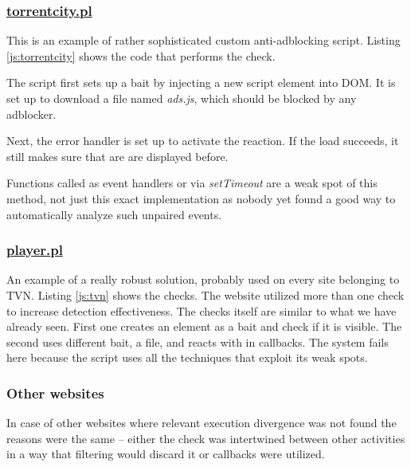 \subsubsection{\url{torrentcity.pl}}
This is an example of rather sophisticated custom anti-adblocking script.
Listing \ref{js:torrentcity} shows the code that performs the check.


                       
The script first sets up a bait by injecting a new script element into DOM. It is set up to download
a file named \emph{ads.js}, which should be blocked by any adblocker.

Next, the error handler is set up to activate the reaction. If the load succeeds, it still
makes sure that are are displayed before.

Functions called as event handlers or via \emph{setTimeout} are a weak spot of this method,
not just this exact implementation as nobody yet found a good way to automatically
analyze such unpaired events.

\subsubsection{\url{player.pl}}
An example of a really robust solution, probably used on every site belonging to TVN.
Listing \ref{js:tvn} shows the checks. The website utilized more than one check
to increase detection effectiveness.
The checks itself are similar to what we have already seen. First one creates an element as a bait 
and check if it is visible. The second uses different bait, a file, and reacts with in callbacks.
The system fails here because the script uses all the techniques that exploit its weak spots.



\subsubsection{Other websites}
In case of other websites where relevant execution divergence was not found 
the reasons were the same -- either the check was intertwined between other activities
in a way that filtering would discard it or callbacks were utilized.

